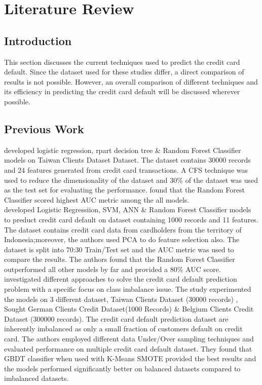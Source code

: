 \documentclass[twoside,11pt,a4paper]{article}
\begin{document}
\section{Literature Review}\label{sec:literature_review}
\subsection{Introduction}
This section discusses the current techniques used to predict the credit card default. Since the dataset used for these studies differ, a direct comparison of results is not possible. However, an overall comparison of different techniques and its efficiency in predicting the credit card default will be discussed wherever possible.

\subsection{Previous Work}
\citep{sayjadah2018credit} developed logistic regression, rpart decision tree \& Random Forest Classifier models on Taiwan Clients Dataset \citep{yeh2009comparisons} Dataset. The dataset contains 30000 records and 24 features generated from credit card transactions. A \acf{CFS} technique was used to reduce the dimensionality of the dataset and 30\% of the dataset was used as the test set for evaluating the performance. \citep{sayjadah2018credit} found that the Random Forest Classifier scored highest \acf{AUC} metric among the all models.\\

\citep{widyadhanacredit} developed Logistic Regressiion, \acs{SVM}, \acs{ANN} \& Random Forest Classifier models to preduct credit card default on dataset containing 1000 records and 11 features. The dataset contains credit card data from cardholders from the territory of Indonesia;moreover, the authors used \acf{PCA} to do feature selection also. The dataset is split into 70:30 Train/Test set and the \acs{AUC} metric was used to compare the results. The authors found that the Random Forest Classifier outperformed all other models by far and provided a 80\% \acs{AUC} score.\\


\citep{alam2020investigation} investigated different approaches to solve the credit card default prediction problem with a specific focus on class imbalance issue. The study experimented the models on 3 different dataset, Taiwan Clients Dataset (30000 records) \citep{yeh2009comparisons}, Sought German Clients Credit Dataset(1000 Records) \& Belgium Clients Credit Dataset (300000 records).  The credit card default prediction dataset are inherently imbalanced as only a small fraction of customers default on credit card. The authors employed different data Under/Over sampling techniques and evaluated performance on multiple credit card default dataset. They found that \acs{GBDT} classifier when used with K-Means \acs{SMOTE} provided the best results and the models performed significantly better on balanced datasets compared to imbalanced datasets.\\
\end{document}
